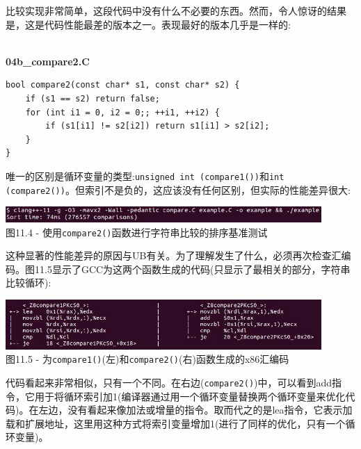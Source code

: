 比较实现非常简单，这段代码中没有什么不必要的东西。然而，令人惊讶的结果是，这是代码性能最差的版本之一。表现最好的版本几乎是一样的:

\hspace*{\fill} \\ %
\noindent
\textbf{04b\_compare2.C}
\begin{lstlisting}[style=styleCXX]
bool compare2(const char* s1, const char* s2) {
	if (s1 == s2) return false;
	for (int i1 = 0, i2 = 0;; ++i1, ++i2) {
		if (s1[i1] != s2[i2]) return s1[i1] > s2[i2];
	}
}
\end{lstlisting}

唯一的区别是循环变量的类型:\texttt{unsigned int (compare1())}和\texttt{int (compare2())}。但索引不是负的，这应该没有任何区别，但实际的性能差异很大:

\begin{center}
\includegraphics[width=0.9\textwidth]{content/3/chapter11/images/4.jpg}\\
图11.4 - 使用\texttt{compare2()}函数进行字符串比较的排序基准测试
\end{center}

这种显著的性能差异的原因与UB有关。为了理解发生了什么，必须再次检查汇编码。图11.5显示了GCC为这两个函数生成的代码(只显示了最相关的部分，字符串比较循环):

\begin{center}
\includegraphics[width=0.9\textwidth]{content/3/chapter11/images/5.jpg}\\
图11.5 - 为\texttt{compare1()}(左)和\texttt{compare2()}(右)函数生成的x86汇编码
\end{center}

代码看起来非常相似，只有一个不同。在右边(\texttt{compare2()})中，可以看到add指令，它用于将循环索引加1(编译器通过用一个循环变量替换两个循环变量来优化代码)。在左边，没有看起来像加法或增量的指令。取而代之的是lea指令，它表示加载和扩展地址，这里用这种方式将索引变量增加1(进行了同样的优化，只有一个循环变量)。 

